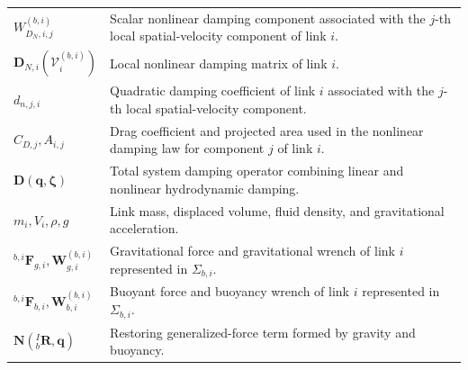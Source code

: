 \documentclass[12pt,a4paper]{report}
\newcommand{\Frame}[1]{\Sigma_{#1}}
\begin{document}
{\begin{longtable}{@{}L{0.30\textwidth}L{0.66\textwidth}@{}}
$W_{D_N,i,j}^{(b,i)}$ & Scalar nonlinear damping component associated with the $j$-th local spatial-velocity component of link $i$. \\
$\mathbf{D}_{N,i}\!\left(\mathcal{V}_i^{(b,i)}\right)$ & Local nonlinear damping matrix of link $i$. \\
$d_{n,j,i}$ & Quadratic damping coefficient of link $i$ associated with the $j$-th local spatial-velocity component. \\
$C_{D,j}, A_{i,j}$ & Drag coefficient and projected area used in the nonlinear damping law for component $j$ of link $i$. \\
$\mathbf{D}(\mathbf{q},\boldsymbol{\zeta})$ & Total system damping operator combining linear and nonlinear hydrodynamic damping. \\
$m_i, V_i, \rho, g$ & Link mass, displaced volume, fluid density, and gravitational acceleration. \\
${}^{b,i}\mathbf{F}_{g,i}, \mathbf{W}_{g,i}^{(b,i)}$ & Gravitational force and gravitational wrench of link $i$ represented in $\Frame{b,i}$. \\
${}^{b,i}\mathbf{F}_{b,i}, \mathbf{W}_{b,i}^{(b,i)}$ & Buoyant force and buoyancy wrench of link $i$ represented in $\Frame{b,i}$. \\
$\mathbf{N}({}_{b}^{I}\mathbf{R},\mathbf{q})$ & Restoring generalized-force term formed by gravity and buoyancy. \\
\end{longtable}
}
\end{document}
